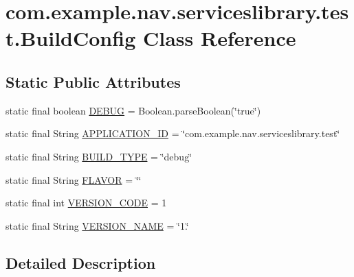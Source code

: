 \hypertarget{classcom_1_1example_1_1nav_1_1serviceslibrary_1_1test_1_1_build_config}{}\section{com.\+example.\+nav.\+serviceslibrary.\+test.\+Build\+Config Class Reference}
\label{classcom_1_1example_1_1nav_1_1serviceslibrary_1_1test_1_1_build_config}
\subsection*{Static Public Attributes}
\begin{DoxyCompactItemize}
\item 
static final boolean \hyperlink{classcom_1_1example_1_1nav_1_1serviceslibrary_1_1test_1_1_build_config_a45a2b052ff2755e249c9a93cde449d9b}{D\+E\+B\+UG} = Boolean.\+parse\+Boolean(\char`\"{}true\char`\"{})
\item 
static final String \hyperlink{classcom_1_1example_1_1nav_1_1serviceslibrary_1_1test_1_1_build_config_aef637b3aa9cd6e92b64d500992a845b9}{A\+P\+P\+L\+I\+C\+A\+T\+I\+O\+N\+\_\+\+ID} = \char`\"{}com.\+example.\+nav.\+serviceslibrary.\+test\char`\"{}
\item 
static final String \hyperlink{classcom_1_1example_1_1nav_1_1serviceslibrary_1_1test_1_1_build_config_ab93b2d43a9178d122d8e06db29afcec6}{B\+U\+I\+L\+D\+\_\+\+T\+Y\+PE} = \char`\"{}debug\char`\"{}
\item 
static final String \hyperlink{classcom_1_1example_1_1nav_1_1serviceslibrary_1_1test_1_1_build_config_a0b9af9247b588bf8afeba14810f3b961}{F\+L\+A\+V\+OR} = \char`\"{}\char`\"{}
\item 
static final int \hyperlink{classcom_1_1example_1_1nav_1_1serviceslibrary_1_1test_1_1_build_config_a8cb9753aa84da12d7005337e7e402033}{V\+E\+R\+S\+I\+O\+N\+\_\+\+C\+O\+DE} = 1
\item 
static final String \hyperlink{classcom_1_1example_1_1nav_1_1serviceslibrary_1_1test_1_1_build_config_aa97bf920241755f014bef41b4d67443f}{V\+E\+R\+S\+I\+O\+N\+\_\+\+N\+A\+ME} = \char`\"{}1.\char`\"{}
\end{DoxyCompactItemize}


\subsection{Detailed Description}


